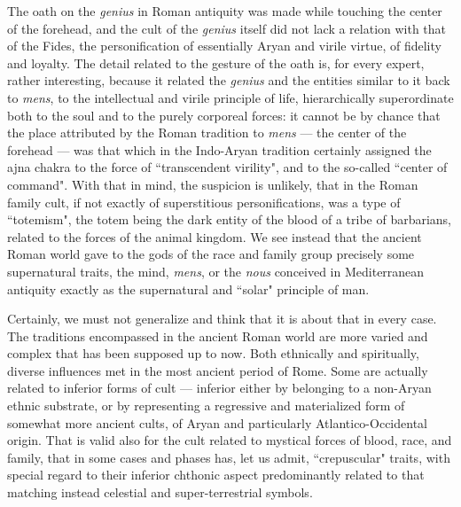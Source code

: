 The oath on the \emph{genius} in Roman antiquity was made while touching the center of the forehead, and the cult of the \emph{genius} itself did not lack a relation with that of the Fides, the personification of essentially Aryan and virile virtue, of fidelity and loyalty. The detail related to the gesture of the oath is, for every expert, rather interesting, because it related the \emph{genius} and the entities similar to it back to \emph{mens}, to the intellectual and virile principle of life, hierarchically superordinate both to the soul and to the purely corporeal forces: it cannot be by chance that the place attributed by the Roman tradition to \emph{mens} — the center of the forehead — was that which in the Indo-Aryan tradition certainly assigned the ajna chakra to the force of ``transcendent virility", and to the so-called ``center of command". With that in mind, the suspicion is unlikely, that in the Roman family cult, if not exactly of superstitious personifications, was a type of ``totemism", the totem being the dark entity of the blood of a tribe of barbarians, related to the forces of the animal kingdom. We see instead that the ancient Roman world gave to the gods of the race and family group precisely some supernatural traits, the mind, \emph{mens}, or the \emph{nous} conceived in Mediterranean antiquity exactly as the supernatural and ``solar" principle of man.

Certainly, we must not generalize and think that it is about that in every case. The traditions encompassed in the ancient Roman world are more varied and complex that has been supposed up to now. Both ethnically and spiritually, diverse influences met in the most ancient period of Rome. Some are actually related to inferior forms of cult — inferior either by belonging to a non-Aryan ethnic substrate, or by representing a regressive and materialized form of somewhat more ancient cults, of Aryan and particularly Atlantico-Occidental origin. That is valid also for the cult related to mystical forces of blood, race, and family, that in some cases and phases has, let us admit, ``crepuscular" traits, with special regard to their inferior chthonic aspect predominantly related to that matching instead celestial and super-terrestrial symbols.

